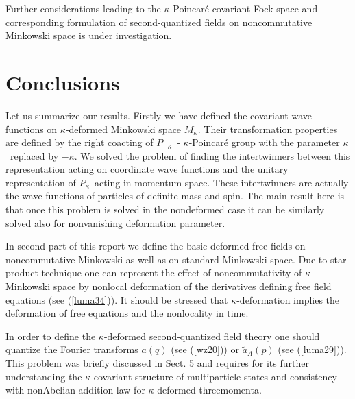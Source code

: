 \documentclass[a4paper,a4paper]{article}
\begin{document}
 Further considerations leading to the $\kappa$-Poincar\'{e}
covariant Fock space and corresponding formulation of
 second-quantized fields on noncommutative Minkowski space
 is under investigation.



\section{Conclusions}
Let us summarize our results. Firstly we have defined the
covariant
 wave functions on
$\kappa$-deformed Minkowski space $M_{\kappa}$.  Their
transformation properties are defined by the right coacting of
$P_{-\kappa}$\ - $\kappa$-Poincar\'{e} group with the parameter
$\kappa$\ replaced by $-\kappa$.  We solved the problem of
finding the intertwinners between this representation acting on
coordinate wave functions and the unitary representation of
$P_{\kappa}$\ acting in momentum space. These  intertwinners are
actually the wave functions of particles of definite mass and
spin.
 The main result here is that once this problem is solved in
the nondeformed case it can be similarly solved also for
nonvanishing deformation parameter.

In second  part of this      report we define the basic deformed
free fields on noncommutative Minkowski as well as on standard
Minkowski space. Due to star product technique one can represent
the effect of noncommutativity of $ \kappa$-Minkowski space by
nonlocal deformation of the derivatives defining free field
equations (see (\ref{luma34})). It should be stressed that
$\kappa$-deformation implies
 the deformation of free equations and
 the nonlocality in time.

In order to     define the $\kappa$-deformed second-quantized
field theory one should quantize the Fourier transforms $a(q)$
(see (\ref{wz20})) or $\widetilde{a}_{A}(p)$ (see
(\ref{luma29})). This problem was
briefly discussed in Sect. 5 and requires for its further understanding
 the $\kappa$-covariant structure of multiparticle states
 and consistency with nonAbelian addition law for
 $\kappa$-deformed threemomenta.
\end{document}
